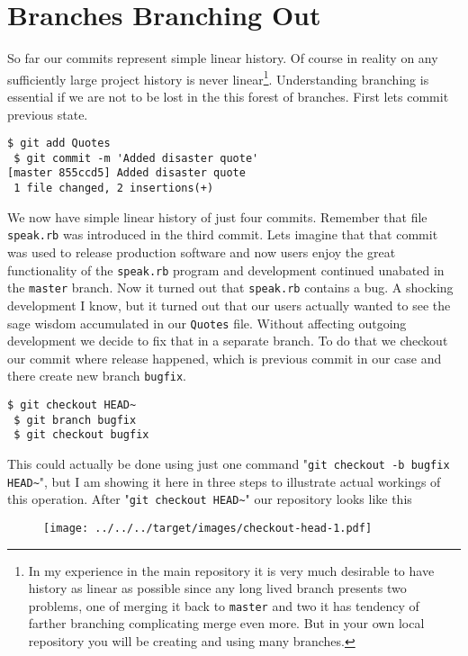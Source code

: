 \documentclass{article}
\theoremstyle{definition}
\begin{document}
        \section{Branches Branching Out}
        So far our commits represent simple linear history. Of course in reality on any sufficiently large project
        history is never linear\footnote{In my experience in the main repository it is very much desirable to have
        history as linear as possible since any long lived branch presents two problems, one of merging it back to
        \texttt{master} and two it has tendency of farther branching complicating merge even more. But in your own local
        repository you will be creating and using many branches.}. Understanding branching is essential if we are
        not to be lost in the this forest of branches. First lets commit previous state.
        \begin{Verbatim}[frame=single]
 $ git add Quotes
 $ git commit -m 'Added disaster quote'
[master 855ccd5] Added disaster quote
 1 file changed, 2 insertions(+)
        \end{Verbatim}
        We now have simple linear history of just four commits. Remember that file \texttt{speak.rb} was introduced in
        the third commit. Lets imagine that that commit was used to release production software and now users enjoy the
        great functionality of the \texttt{speak.rb} program and development continued unabated in the \texttt{master}
        branch. Now it turned out that \texttt{speak.rb} contains a bug. A shocking development I know, but it turned
        out that our users actually wanted to see the sage wisdom accumulated in our \texttt{Quotes} file. Without
        affecting outgoing development we decide to fix that in a separate branch. To do that we checkout our commit
        where release happened, which is previous commit in our case and there create new branch \texttt{bugfix}.
        \begin{Verbatim}[frame=single]
 $ git checkout HEAD~
 $ git branch bugfix
 $ git checkout bugfix
        \end{Verbatim}
        This could actually be done using just one command "\texttt{git checkout -b bugfix HEAD\textasciitilde}", but I
        am showing it here in three steps to illustrate actual workings of this operation.
        After "\texttt{git checkout HEAD\textasciitilde}" our repository looks like this

        \begin{figure}[h]
        \centering\texttt{[image: ../../../target/images/checkout-head-1.pdf]}
        \caption{\label{fig:checkout-head-1}}
        \end{figure}
\end{document}
